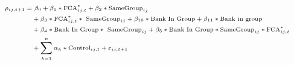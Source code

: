 \begin{equation*}
\scriptsize
\begin{split}
\rho_{ij,t+1} = & \text{ 	}\beta_0   + \beta_1* \text{FCA}_{ij,t}^*  + \beta_2 * \text{SameGroup}_{ij} 	\\
 &+\beta_3 * \text{FCA}_{ij,t}^* *\ \text{SameGroup}_{ij}  + \beta_{10} *\text{Bank In Group} + \beta_{11}*\text{Bank in group} \\
  & + \beta_4 * \text{Bank In Group}*\ \text{SameGroup}_{ij}  + \beta_5 * \text{Bank In Group}* \text{SameGroup}_{ij} * \text{FCA}_{ij,t}^*  \\
   &+ \sum_{k=1} ^{n} \alpha_k*\text{Control}_{ij,t} + \varepsilon_{ij,t+1}
\end{split}
\end{equation*}